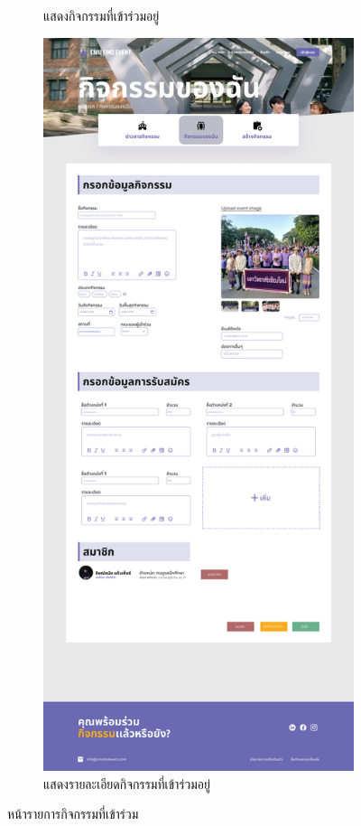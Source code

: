 \begin{figure}[h]
\begin{subfigure}[b]{0.3\linewidth}
    \caption{แสดงกิจกรรมที่เข้าร่วมอยู่}
  \end{subfigure}
  \hfill
  \begin{subfigure}[b]{0.3\linewidth}
    \includegraphics[width=\linewidth]{image/Figma-design/New-Mine-event2.png}
    \caption{แสดงรายละเอียดกิจกรรมที่เข้าร่วมอยู่}
  \end{subfigure}
  \caption{หน้ารายการกิจกรรมที่เข้าร่วม}
  \label{fig:event-mine}
\end{figure}

